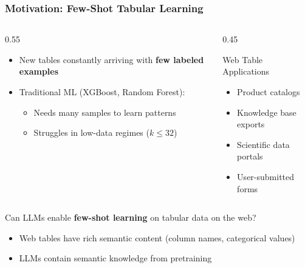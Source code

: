 \documentclass[
	10pt, %
	aspectratio=169, %
]{beamer}
\begin{document}

\begin{frame}
	\frametitle{Motivation: Few-Shot Tabular Learning}
	\begin{columns}[c]
		\begin{column}{0.55\textwidth}
			\begin{itemize}
				\item New tables constantly arriving with \textbf{few labeled examples}
				\item Traditional ML (XGBoost, Random Forest):
				      \begin{itemize}
					      \item Needs many samples to learn patterns
					      \item Struggles in low-data regimes ($k \leq 32$)
				      \end{itemize}
			\end{itemize}
		\end{column}
		\begin{column}{0.45\textwidth}
			\begin{secondaryblock}{Web Table Applications}
				\begin{itemize}
					\item Product catalogs
					\item Knowledge base exports
					\item Scientific data portals
					\item User-submitted forms
				\end{itemize}
			\end{secondaryblock}
		\end{column}
	\end{columns}
	\vfill
	 Can LLMs enable \textbf{few-shot learning} on tabular data on the web?
	\begin{itemize}
		\item Web tables have rich semantic content (column names, categorical values)
		\item LLMs contain semantic knowledge from pretraining
	\end{itemize}
\end{frame}
\end{document}
